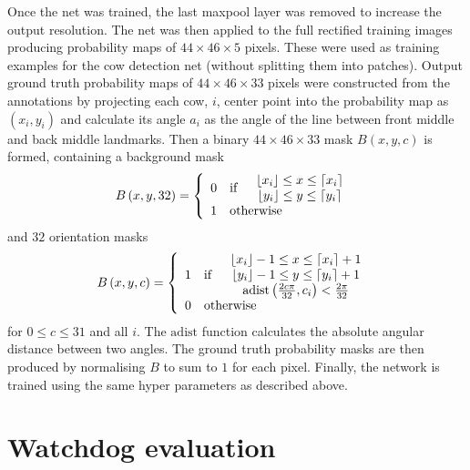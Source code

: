 \documentclass[10pt,a4paper,twocolumn]{article}
\begin{document}
Once the net was trained, the last maxpool layer was removed to increase the output resolution. The net was then applied to the full rectified training images producing probability maps of $44\times 46\times 5$ pixels. These were used as training examples for the cow detection net (without splitting them into patches). Output ground truth probability maps of $44\times 46\times 33$ pixels were constructed from the annotations by projecting each cow, $i$, center point into the probability map as $\left( x_i, y_i \right)$ and calculate its angle $a_i$ as the angle of the line between front middle and back middle landmarks. Then a binary $44\times 46\times 33$ mask $B\left( x, y, c \right)$ is formed, containing a background mask
\begin{equation}
B\left( x, y, 32 \right) = \left\lbrace
\begin{array}{clc}
0 & \text{if} &
\begin{array}{c}
 \lfloor x_i \rfloor \leq x \leq \lceil x_i \rceil \\
 \lfloor y_i \rfloor \leq y \leq \lceil y_i \rceil
\end{array}
\\
1 & \multicolumn{2}{l}{\text{otherwise}}
\end{array}
\right.
\end{equation}
and $32$ orientation masks
\begin{equation}
B\left( x, y, c \right) = \left\lbrace
\begin{array}{clc}
1 & \text{if} &
\begin{array}{c}
 \lfloor x_i \rfloor-1 \leq x \leq \lceil x_i \rceil+1 \\
 \lfloor y_i \rfloor-1 \leq y \leq \lceil y_i \rceil+1 \\
 \mathrm{adist}\left(\frac{2c\pi}{32}, c_i\right) < \frac{2\pi}{32} \\
\end{array}
\\
0 & \multicolumn{2}{l}{\text{otherwise}}
\end{array}
\right.
\end{equation}
for $0\leq c \leq 31$ and all $i$. The $\mathrm{adist}$ function calculates the absolute angular distance between two angles. The ground truth probability masks are then produced by normalising $B$ to sum to $1$ for each pixel. Finally, the network is trained using the same hyper parameters as described above.

\section{Watchdog evaluation}
\end{document}

